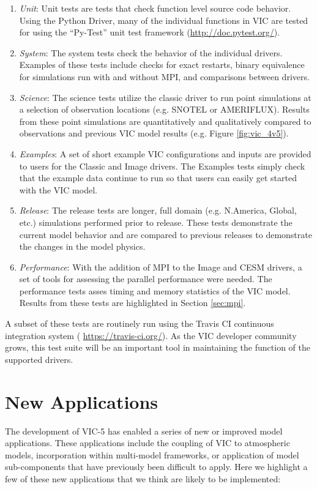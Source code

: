 \documentclass[gmd, manuscript]{copernicus}
\begin{document}
    \begin{enumerate}
      \item \textit{Unit}: Unit tests are tests that check function level source code behavior.
      Using the Python Driver, many of the individual functions in VIC are tested for using the ``Py-Test'' unit test framework (\url{http://doc.pytest.org/}).
      \item \textit{System}: The system tests check the behavior of the individual drivers.
      Examples of these tests include checks for exact restarts, binary equivalence for simulations run with and without MPI, and comparisons between drivers.
      \item \textit{Science}: The science tests utilize the classic driver to run point simulations at a selection of observation locations (e.g. SNOTEL or AMERIFLUX).
      Results from these point simulations are quantitatively and qualitatively compared to observations and previous VIC model results (e.g. Figure \ref{fig:vic_4v5}).
      \item \textit{Examples}: A set of short example VIC configurations and inputs are provided to users for the Classic and Image drivers.
      The Examples tests simply check that the example data continue to run so that users can easily get started with the VIC model.
      \item \textit{Release}: The release tests are longer, full domain (e.g. N.America, Global, etc.) simulations performed prior to release.
      These tests demonstrate the current model behavior and are compared to previous releases to demonstrate the changes in the model physics.
      \item \textit{Performance}: With the addition of MPI to the Image and CESM drivers, a set of tools for assessing the parallel performance were needed.
      The performance tests asses timing and memory statistics of the VIC model.
      Results from these tests are highlighted in Section \ref{sec:mpi}.
    \end{enumerate}

    A subset of these tests are routinely run using the Travis CI continuous integration system ( \url{https://travis-ci.org/}).
    As the VIC developer community grows, this test suite will be an important tool in maintaining the function of the supported drivers.

\section{New Applications}
  \label{sec:new_apps}
  The development of VIC-5 has enabled a series of new or improved model applications.
  These applications include the coupling of VIC to atmospheric models, incorporation within multi-model frameworks, or application of model sub-components that have previously been difficult to apply.
  Here we highlight a few of these new applications that we think are likely to be implemented:
\end{document}
